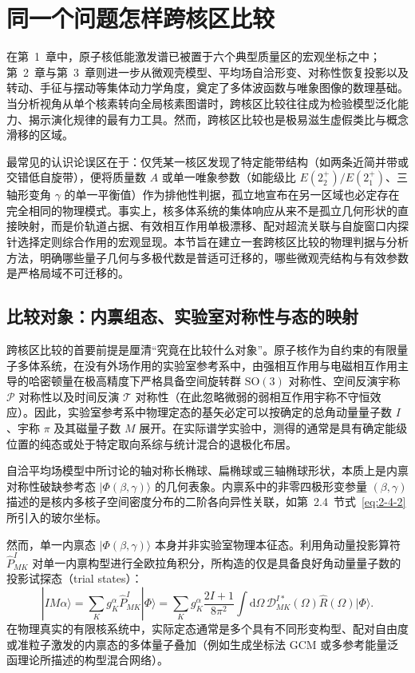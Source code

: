 \section{同一个问题怎样跨核区比较}\label{sec:4-1}

在第~1~章中，原子核低能激发谱已被置于六个典型质量区的宏观坐标之中；第~2~章与第~3~章则进一步从微观壳模型、平均场自洽形变、对称性恢复投影以及转动、手征与摆动等集体动力学角度，奠定了多体波函数与唯象图像的数理基础。当分析视角从单个核素转向全局核素图谱时，跨核区比较往往成为检验模型泛化能力、揭示演化规律的最有力工具。然而，跨核区比较也是极易滋生虚假类比与概念滑移的区域。

最常见的认识论误区在于：仅凭某一核区发现了特定能带结构（如两条近简并带或交错低自旋带），便将质量数 $A$ 或单一唯象参数（如能级比 $E(2^+_2)/E(2^+_1)$、三轴形变角 $\gamma$ 的单一平衡值）作为排他性判据，孤立地宣布在另一区域也必定存在完全相同的物理模式。事实上，核多体系统的集体响应从来不是孤立几何形状的直接映射，而是价轨道占据、有效相互作用单极漂移、配对超流关联与自旋窗口内探针选择定则综合作用的宏观显现。本节旨在建立一套跨核区比较的物理判据与分析方法，明确哪些量子几何与多极代数是普适可迁移的，哪些微观壳结构与有效参数是严格局域不可迁移的。

\subsection{比较对象：内禀组态、实验室对称性与态的映射}\label{sec:4-1-1}

跨核区比较的首要前提是厘清``究竟在比较什么对象''。原子核作为自约束的有限量子多体系统，在没有外场作用的实验室参考系中，由强相互作用与电磁相互作用主导的哈密顿量在极高精度下严格具备空间旋转群 $\mathrm{SO}(3)$ 对称性、空间反演宇称 $\mathcal{P}$ 对称性以及时间反演 $\mathcal{T}$ 对称性（在此忽略微弱的弱相互作用宇称不守恒效应）。因此，实验室参考系中物理定态的基矢必定可以按确定的总角动量量子数 $I$、宇称 $\pi$ 及其磁量子数 $M$ 展开。在实际谱学实验中，测得的通常是具有确定能级位置的纯态或处于特定取向系综与统计混合的退极化布居。

自洽平均场模型中所讨论的轴对称长椭球、扁椭球或三轴椭球形状，本质上是内禀对称性破缺参考态 $|\Phi(\beta,\gamma)\rangle$ 的几何表象。内禀系中的非零四极形变参量 $(\beta, \gamma)$ 描述的是核内多核子空间密度分布的二阶各向异性关联，如第~2.4~节式~\eqref{eq:2-4-2}所引入的玻尔坐标。

然而，单一内禀态 $|\Phi(\beta,\gamma)\rangle$ 本身并非实验室物理本征态。利用角动量投影算符 $\hat{P}^I_{MK}$ 对单一内禀构型进行全欧拉角积分，所构造的仅是具备良好角动量量子数的投影试探态（trial states）：
\begin{equation}\label{eq:4-1-projection}
|IM\alpha\rangle = \sum_K g_K^\alpha \hat{P}^I_{MK} |\Phi\rangle = \sum_K g_K^\alpha \frac{2I+1}{8\pi^2} \int \mathrm{d}\Omega \, \mathcal{D}^{I*}_{MK}(\Omega) \hat{R}(\Omega) |\Phi\rangle.
\end{equation}
在物理真实的有限核系统中，实际定态通常是多个具有不同形变构型、配对自由度或准粒子激发的内禀态的多体量子叠加（例如生成坐标法 GCM 或多参考能量泛函理论所描述的构型混合网络）。

